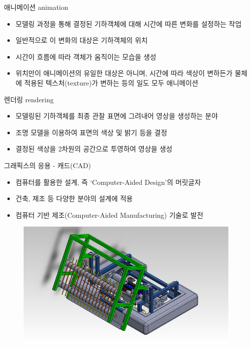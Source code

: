 \documentclass{beamer}
\begin{document}
\begin{frame}{애니메이션 animation}

\begin{itemize}
\item 모델링 과정을 통해 결정된 기하객체에 대해 시간에 따른 변화를 설정하는 작업
\item 일반적으로 이 변화의 대상은 기하객체의 위치
\item 시간이 흐름에 따라 객체가 움직이는 모습을 생성
\item 위치만이 애니메이션의 유일한 대상은 아니며, 시간에 따라 색상이 변하든가 물체에 적용된 텍스처(texture)가 변하는 등의 일도 모두 애니메이션
\end{itemize}

\end{frame}

\begin{frame}{렌더링 rendering}

\begin{itemize}
\item 모델링된 기하객체를 최종 관찰 표면에 그려내어 영상을 생성하는 분야
\item 조명 모델을 이용하여 표면의 색상 및 밝기 등을 결정
\item 결정된 색상을 2차원의 공간으로 투영하여 영상을 생성
\end{itemize}
\end{frame}

\begin{frame}{그래픽스의 응용 - 캐드(CAD)}

\begin{itemize}
\item 컴퓨터를 활용한 설계, 즉 ‘Computer-Aided Design’의 머릿글자
\item 건축, 제조 등 다양한 분야의 설계에 적용
\item 컴퓨터 기반 제조(Computer-Aided Manufacturing) 기술로 발전
\end{itemize}

\begin{figure}
\includegraphics[width=11cm]{OGL_intro/CAD.jpg}
\end{figure}

\end{frame}
\end{document}
